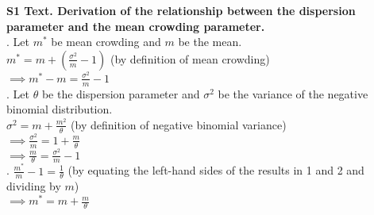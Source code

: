 \documentclass{article}
\begin{document}
{\noindent \bf S1 Text. Derivation of the relationship between the dispersion parameter and the mean crowding parameter.}\\

. Let $m^*$ be mean crowding and $m$ be the mean.\\
$m^* = m +(\frac{\sigma^2}{m} -1)$ (by definition of mean crowding)\\
$ \implies m^*- m = \frac{\sigma^2}{m} -1$\\

. Let $\theta$ be the dispersion parameter and $\sigma^2$ be the variance of the negative binomial distribution.\\ 
$\sigma^2 = m + \frac{m^2}{\theta}$ (by definition of negative binomial variance)\\ $\implies \frac{\sigma^2}{m} = 1 + \frac{m}{\theta}$\\
$\implies \frac{m}{\theta} = \frac{\sigma^2}{m} - 1$\\

. $\frac{m^*}{m} - 1 = \frac{1}{\theta}$ (by equating the left-hand sides of the results in 1 and 2 and dividing by $m$) \\
$\implies m^*= m + \frac{m}{\theta}$
\end{document}
